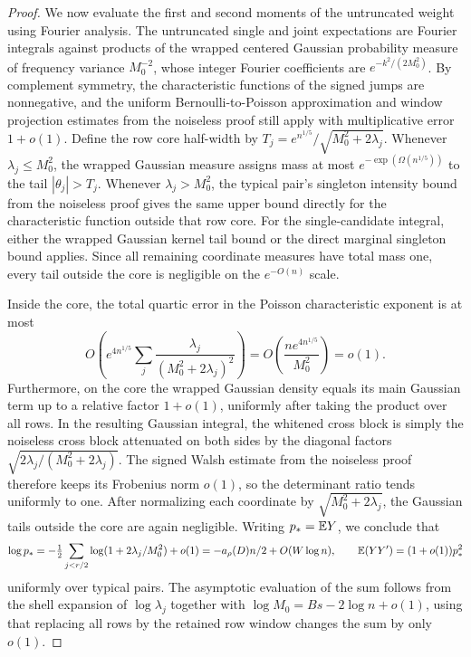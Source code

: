 \begin{proof}
We now evaluate the first and second moments of the untruncated weight using Fourier analysis. The untruncated single and joint expectations are Fourier integrals against products of the wrapped centered Gaussian probability measure of frequency variance \(M_0^{-2}\), whose integer Fourier coefficients are \(e^{-k^2/(2M_0^2)}\). By complement symmetry, the characteristic functions of the signed jumps are nonnegative, and the uniform Bernoulli-to-Poisson approximation and window projection estimates from the noiseless proof still apply with multiplicative error \(1+o(1)\). Define the row core half-width by \(T_j=e^{n^{1/5}}/\sqrt{M_0^2+2\lambda_j}\). Whenever \(\lambda_j\le M_0^2\), the wrapped Gaussian measure assigns mass at most \(e^{-\exp(\Omega(n^{1/5}))}\) to the tail \(|\theta_j|>T_j\). Whenever \(\lambda_j>M_0^2\), the typical pair's singleton intensity bound from the noiseless proof gives the same upper bound directly for the characteristic function outside that row core. For the single-candidate integral, either the wrapped Gaussian kernel tail bound or the direct marginal singleton bound applies. Since all remaining coordinate measures have total mass one, every tail outside the core is negligible on the \(e^{-O(n)}\) scale.

Inside the core, the total quartic error in the Poisson characteristic exponent is at most
\[
 O\left( e^{4n^{1/5}}
          \sum_j\frac{\lambda_j}{(M_0^2+2\lambda_j)^2}\right)
 =O\left(\frac{n e^{4n^{1/5}}}{M_0^2}\right)=o(1).
\]
Furthermore, on the core the wrapped Gaussian density equals its main Gaussian term up to a relative factor \(1+o(1)\), uniformly after taking the product over all rows. In the resulting Gaussian integral, the whitened cross block is simply the noiseless cross block attenuated on both sides by the diagonal factors \(\sqrt{2\lambda_j/(M_0^2+2\lambda_j)}\). The signed Walsh estimate from the noiseless proof therefore keeps its Frobenius norm \(o(1)\), so the determinant ratio tends uniformly to one. After normalizing each coordinate by \(\sqrt{M_0^2+2\lambda_j}\), the Gaussian tails outside the core are again negligible. Writing \(p_*=\mathbb E Y\), we conclude that
\[
 \log p_*=-\tfrac12\sum_{j<r/2}\log(1+2\lambda_j/M_0^2)+o(1)
          =-a_\rho(D)n/2+O(W\log n),
 \qquad \mathbb E(YY')=(1+o(1))p_*^2
\]
uniformly over typical pairs. The asymptotic evaluation of the sum follows from the shell expansion of \(\log\lambda_j\) together with \(\log M_0=Bs-2\log n+o(1)\), using that replacing all rows by the retained row window changes the sum by only \(o(1)\).


\end{proof}
